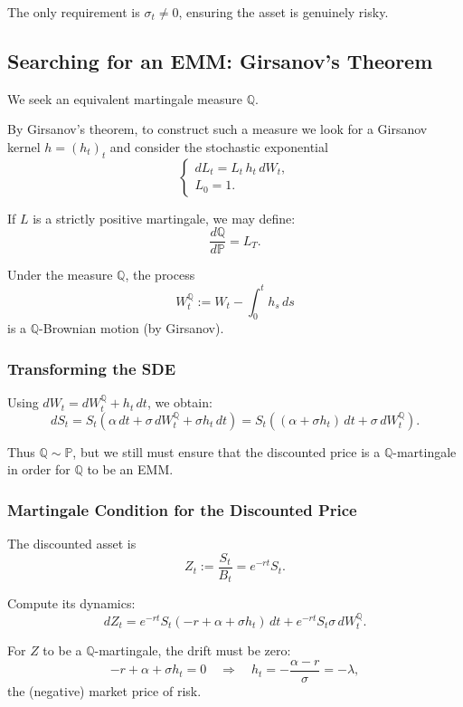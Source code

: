 \documentclass[12pt,a4paper]{article}
\theoremstyle{definition}
\begin{document}
The only requirement is $\sigma_t \neq 0$, ensuring the asset is genuinely risky.

\subsection{Searching for an EMM: Girsanov's Theorem}

We seek an equivalent martingale measure $\mathbb{Q}$.

By Girsanov's theorem, to construct such a measure we look for a Girsanov kernel $h = (h_t)_t$ and consider the stochastic exponential
\[
\begin{cases}
dL_t = L_t \, h_t \, dW_t, \\
L_0 = 1.
\end{cases}
\]

If $L$ is a strictly positive martingale, we may define:
\[
\frac{d\mathbb{Q}}{d\mathbb{P}} = L_T.
\]

Under the measure $\mathbb{Q}$, the process
\[
W_t^\mathbb{Q} := W_t - \int_0^t h_s \, ds
\]
is a $\mathbb{Q}$-Brownian motion (by Girsanov).

\subsubsection{Transforming the SDE}

Using $dW_t = dW_t^\mathbb{Q} + h_t \, dt$, we obtain:
\[
dS_t = S_t(\alpha \, dt + \sigma \, dW_t^\mathbb{Q} + \sigma h_t \, dt) = S_t((\alpha + \sigma h_t) \, dt + \sigma \, dW_t^\mathbb{Q}).
\]

Thus $\mathbb{Q} \sim \mathbb{P}$, but we still must ensure that the discounted price is a $\mathbb{Q}$-martingale in order for $\mathbb{Q}$ to be an EMM.

\subsubsection{Martingale Condition for the Discounted Price}

The discounted asset is
\[
Z_t := \frac{S_t}{B_t} = e^{-rt} S_t.
\]

Compute its dynamics:
\[
dZ_t = e^{-rt} S_t (-r + \alpha + \sigma h_t) \, dt + e^{-rt} S_t \sigma \, dW_t^\mathbb{Q}.
\]

For $Z$ to be a $\mathbb{Q}$-martingale, the drift must be zero:
\[
-r + \alpha + \sigma h_t = 0 \quad \Longrightarrow \quad h_t = -\frac{\alpha - r}{\sigma} = -\lambda,
\]
the (negative) market price of risk.
\end{document}
